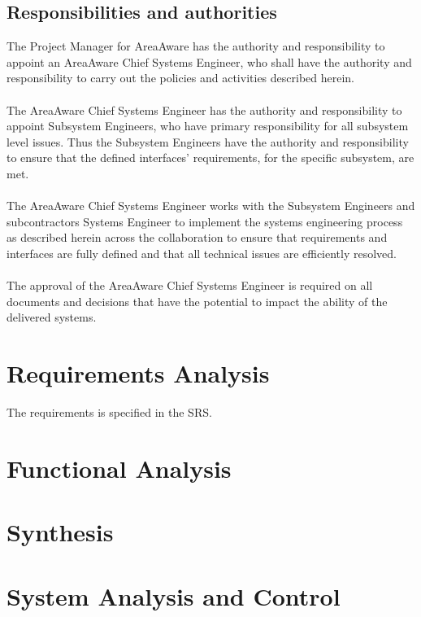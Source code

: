 \subsection{Responsibilities and authorities}
The Project Manager for AreaAware has the authority and responsibility to appoint an AreaAware Chief Systems Engineer, who shall have the authority and responsibility to carry out the policies and activities described herein.\\\\
The AreaAware Chief Systems Engineer has the authority and responsibility to appoint Subsystem Engineers, who have primary responsibility for all subsystem level issues.
Thus the Subsystem Engineers have the authority and responsibility to ensure that the defined interfaces' requirements, for the specific subsystem, are met.\\\\
The AreaAware Chief Systems Engineer works with the Subsystem Engineers and subcontractors Systems Engineer to implement the systems engineering process as described herein across the collaboration to ensure that requirements and interfaces are fully defined and that all technical issues are efficiently resolved.\\\\
The approval of the AreaAware Chief Systems Engineer is required on all documents and decisions that have the potential to impact the ability of the delivered systems.

\section{Requirements Analysis}
The requirements is specified in the SRS.


\section{Functional Analysis}


\section{Synthesis}


\section {System Analysis and Control}
